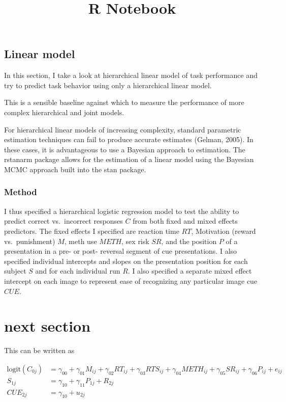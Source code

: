 \documentclass[]{article}
\title{R Notebook}
\author{}
\date{}
\begin{document}
\maketitle

\subsection{Linear model}\label{linear-model}

In this section, I take a look at hierarchical linear model of task
performance and try to predict task behavior using only a hierarchical
linear model.

This is a sensible baseline against which to measure the performance of
more complex hierarchical and joint models.

For hierarchical linear models of increasing complexity, standard
parametric estimation techniques can fail to produce accurate estimates
(Gelman, 2005). In these cases, it is advantageous to use a Bayesian
approach to estimation. The rstanarm package allows for the estimation
of a linear model using the Bayesian MCMC approach built into the stan
package.

\subsubsection{Method}\label{method}

I thus specified a hierarchical logistic regression model to test the
ability to predict correct vs.~incorrect responses \(C\) from both fixed
and mixed effects predictors. The fixed effects I specified are reaction
time \(RT\), Motivation (reward vs.~punishment) \(M\), meth use
\(METH\), sex risk \(SR\), and the position \(P\) of a presentation in a
pre- or post- reversal segment of cue presentations. I also specified
individual intercepts and slopes on the presentation position for each
subject \(S\) and for each individual run \(R\). I also specified a
separate mixed effect intercept on each image to represent ease of
recognizing any particular image cue \(CUE\).

\section{next section}\label{next-section}

This can be written as

\[\begin{aligned}
\text{logit}(C_{0 j}) & = \gamma_{0 0}+\gamma_{0 1} M_{ij}+\gamma_{0 2} RT_{ij}+\gamma_{0 3} RTS_{ij}+\gamma_{0 4} METH_{ij}+\gamma_{0 5} SR_{ij}+\gamma_{0 6} P_{ij} + e_{i j} \\
S_{1 j} & = \gamma_{10} + \gamma_{1 1} P_{1j} + R_{2j}\\
CUE_{2 j} & = \gamma_{10} + u_{2j}
\end{aligned}\]
\end{document}
